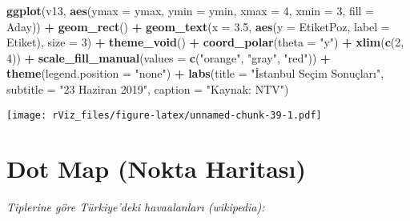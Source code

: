 \documentclass[
]{book}
\newenvironment{Shaded}{\begin{snugshade}}{\end{snugshade}}
\newcommand{\DataTypeTok}[1]{\textcolor[rgb]{0.13,0.29,0.53}{#1}}
\newcommand{\DecValTok}[1]{\textcolor[rgb]{0.00,0.00,0.81}{#1}}
\newcommand{\FloatTok}[1]{\textcolor[rgb]{0.00,0.00,0.81}{#1}}
\newcommand{\KeywordTok}[1]{\textcolor[rgb]{0.13,0.29,0.53}{\textbf{#1}}}
\newcommand{\NormalTok}[1]{#1}
\newcommand{\OperatorTok}[1]{\textcolor[rgb]{0.81,0.36,0.00}{\textbf{#1}}}
\newcommand{\StringTok}[1]{\textcolor[rgb]{0.31,0.60,0.02}{#1}}
\begin{document}
\begin{Shaded}
\begin{Highlighting}[]
\KeywordTok{ggplot}\NormalTok{(v13, }\KeywordTok{aes}\NormalTok{(}\DataTypeTok{ymax =}\NormalTok{ ymax, }\DataTypeTok{ymin =}\NormalTok{ ymin, }\DataTypeTok{xmax =} \DecValTok{4}\NormalTok{, }\DataTypeTok{xmin =} \DecValTok{3}\NormalTok{, }\DataTypeTok{fill =}\NormalTok{ Aday)) }\OperatorTok{+}
\StringTok{  }\KeywordTok{geom_rect}\NormalTok{() }\OperatorTok{+}
\StringTok{  }\KeywordTok{geom_text}\NormalTok{(}\DataTypeTok{x =} \FloatTok{3.5}\NormalTok{, }\KeywordTok{aes}\NormalTok{(}\DataTypeTok{y =}\NormalTok{ EtiketPoz, }\DataTypeTok{label =}\NormalTok{ Etiket), }\DataTypeTok{size =} \DecValTok{3}\NormalTok{) }\OperatorTok{+}
\StringTok{  }\KeywordTok{theme_void}\NormalTok{() }\OperatorTok{+}
\StringTok{  }\KeywordTok{coord_polar}\NormalTok{(}\DataTypeTok{theta =} \StringTok{"y"}\NormalTok{) }\OperatorTok{+}
\StringTok{  }\KeywordTok{xlim}\NormalTok{(}\KeywordTok{c}\NormalTok{(}\DecValTok{2}\NormalTok{, }\DecValTok{4}\NormalTok{)) }\OperatorTok{+}
\StringTok{  }\KeywordTok{scale_fill_manual}\NormalTok{(}\DataTypeTok{values =} \KeywordTok{c}\NormalTok{(}\StringTok{"orange"}\NormalTok{, }\StringTok{"gray"}\NormalTok{, }\StringTok{"red"}\NormalTok{)) }\OperatorTok{+}
\StringTok{  }\KeywordTok{theme}\NormalTok{(}\DataTypeTok{legend.position =} \StringTok{"none"}\NormalTok{) }\OperatorTok{+}
\StringTok{  }\KeywordTok{labs}\NormalTok{(}\DataTypeTok{title =} \StringTok{"İstanbul Seçim Sonuçları"}\NormalTok{,}
       \DataTypeTok{subtitle =} \StringTok{"23 Haziran 2019"}\NormalTok{,}
       \DataTypeTok{caption =} \StringTok{"Kaynak: NTV"}\NormalTok{)}
\end{Highlighting}
\end{Shaded}

\texttt{[image: rViz\_files/figure-latex/unnamed-chunk-39-1.pdf]}

\hypertarget{dot-map-nokta-haritasux131}{%
\section{Dot Map (Nokta Haritası)}\label{dot-map-nokta-haritasux131}}

\emph{Tiplerine göre Türkiye'deki havaalanları (wikipedia):}
\end{document}
